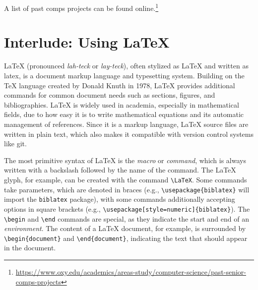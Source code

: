 \documentclass[10pt,twocolumn]{article}
\begin{document}
A list of past comps projects can be found online.\footnote{\url{https://www.oxy.edu/academics/areas-study/computer-science/past-senior-comps-projects}}

\section{Interlude: Using \LaTeX}

LaTeX (pronounced \textit{lah-teck} or \textit{lay-teck}), often stylized as {\LaTeX} and written as latex, is a document markup language and typesetting system.
Building on the {\TeX} language created by Donald Knuth in 1978, LaTeX provides additional commands for common document needs such as sections, figures, and bibliographies.
LaTeX is widely used in academia, especially in mathematical fields, due to how easy it is to write mathematical equations and its automatic management of references.
Since it is a markup language, LaTeX source files are written in plain text, which also makes it compatible with version control systems like git.

The most primitive syntax of LaTeX is the \textit{macro} or \textit{command}, which is always written with a backslash followed by the name of the command.
The {\LaTeX} glyph, for example, can be created with the command \texttt{\textbackslash LaTeX}.
Some commands take parameters, which are denoted in braces (e.g., \texttt{\textbackslash usepackage\{biblatex\}} will import the \texttt{biblatex} package), with some commands additionally accepting options in square brackets (e.g., \texttt{\textbackslash usepackage[style=numeric]\{biblatex\}}).
The \texttt{\textbackslash begin} and \texttt{\textbackslash end} commands are special, as they indicate the start and end of an \textit{environment}.
The content of a LaTeX document, for example, is surrounded by \texttt{\textbackslash begin\{document\}} and \texttt{\textbackslash end\{document\}}, indicating the text that should appear in the document.
\end{document}

